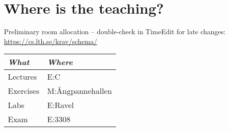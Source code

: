 \documentclass{program}
\begin{document}
\section{Where is the teaching?}

\noindent Preliminary room allocation -- double-check in TimeEdit for late changes:\\ \url{https://cs.lth.se/krav/schema/}
\begin{flushleft}
\small
\begin{tabular}{l | l } 
{\it What} & {\it Where} \\
\hline
Lectures & E:C  
\\
Exercises & M:Ångpannehallen %
\\
Labs & E:Ravel %
\\
Exam & E:3308\\
\end{tabular}
\end{flushleft}

\end{document}
